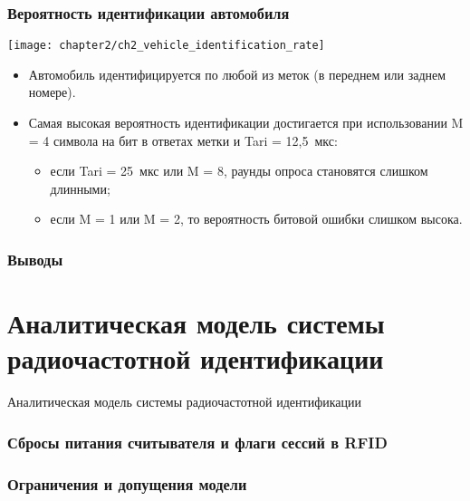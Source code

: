 \begin{frame}
    \frametitle{Вероятность идентификации автомобиля}
    \begin{center}
        \texttt{[image: chapter2/ch2\_vehicle\_identification\_rate]}
    \end{center}
    \begin{itemize}
        \item Автомобиль идентифицируется по любой из меток (в переднем или заднем номере).
        \item Самая высокая вероятность идентификации достигается при использовании M = 4 символа на бит в ответах метки и Tari = 12,5~мкс:
        \begin{itemize}
            \item если Tari = 25~мкс или M = 8, раунды опроса становятся слишком длинными;
            \item если M = 1 или M = 2, то вероятность битовой ошибки слишком высока.
        \end{itemize}
    \end{itemize}

\end{frame}

\begin{frame}
    \frametitle{Выводы}
\end{frame}



\section{Аналитическая модель системы радиочастотной идентификации}
\begin{frame}
    \begin{center}
        \Huge
        Аналитическая модель системы радиочастотной идентификации
    \end{center}
\end{frame}

\begin{frame}
    \frametitle{Сбросы питания считывателя и флаги сессий в RFID}
\end{frame}

\begin{frame}
    \frametitle{Ограничения и допущения модели}
\end{frame}

